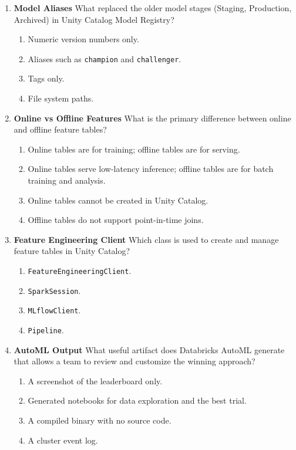 \documentclass{article}
\begin{document}
\begin{enumerate}[label=\textbf{Q\arabic*.}]
		\item \textbf{Model Aliases}
		What replaced the older model stages (Staging, Production, Archived) in Unity Catalog Model Registry?
		\begin{enumerate}[label=\Alph*.]
			\item Numeric version numbers only.
			\item Aliases such as \texttt{champion} and \texttt{challenger}.
			\item Tags only.
			\item File system paths.
		\end{enumerate}
		
		\item \textbf{Online vs Offline Features}
		What is the primary difference between online and offline feature tables?
		\begin{enumerate}[label=\Alph*.]
			\item Online tables are for training; offline tables are for serving.
			\item Online tables serve low-latency inference; offline tables are for batch training and analysis.
			\item Online tables cannot be created in Unity Catalog.
			\item Offline tables do not support point-in-time joins.
		\end{enumerate}
		
		\item \textbf{Feature Engineering Client}
		Which class is used to create and manage feature tables in Unity Catalog?
		\begin{enumerate}[label=\Alph*.]
			\item \texttt{FeatureEngineeringClient}.
			\item \texttt{SparkSession}.
			\item \texttt{MLflowClient}.
			\item \texttt{Pipeline}.
		\end{enumerate}
		
		\item \textbf{AutoML Output}
		What useful artifact does Databricks AutoML generate that allows a team to review and customize the winning approach?
		\begin{enumerate}[label=\Alph*.]
			\item A screenshot of the leaderboard only.
			\item Generated notebooks for data exploration and the best trial.
			\item A compiled binary with no source code.
			\item A cluster event log.
		\end{enumerate}
		

\end{enumerate}
\end{document}
